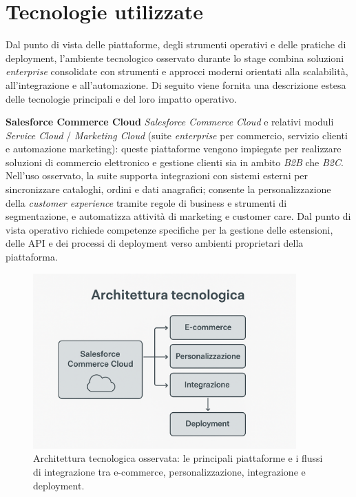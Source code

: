 \section{Tecnologie utilizzate}

Dal punto di vista delle piattaforme, degli strumenti operativi e delle pratiche di deployment, l’ambiente tecnologico osservato durante lo stage combina soluzioni \emph{enterprise} 
consolidate con strumenti e approcci moderni orientati alla scalabilità, all’integrazione e all’automazione. 
Di seguito viene fornita una descrizione estesa delle tecnologie principali e del loro impatto operativo.

\medskip
\noindent\textbf{Salesforce Commerce Cloud}
\emph{Salesforce Commerce Cloud} e relativi moduli \emph{Service Cloud} / \emph{Marketing Cloud} (suite \emph{enterprise} per commercio, servizio clienti e automazione marketing): 
queste piattaforme vengono impiegate per realizzare soluzioni di commercio elettronico e gestione clienti sia in ambito \emph{B2B} che \emph{B2C}. Nell’uso osservato, la suite supporta 
integrazioni con sistemi esterni per sincronizzare cataloghi, ordini e dati anagrafici; consente la personalizzazione della \emph{customer experience} tramite regole di business e strumenti di segmentazione,
e automatizza attività di marketing e customer care. Dal punto di vista operativo richiede competenze specifiche per la gestione delle estensioni, delle API e dei processi di deployment 
verso ambienti proprietari della piattaforma.

\begin{figure}[htbp]
    \centering
    \includegraphics[width=0.9\textwidth]{images/azienda/architettura_tecnologica}
    \caption{Architettura tecnologica osservata: le principali piattaforme e i flussi di integrazione tra e-commerce, personalizzazione, integrazione e deployment.}
    \label{fig:architettura_tecnologica}
\end{figure}


